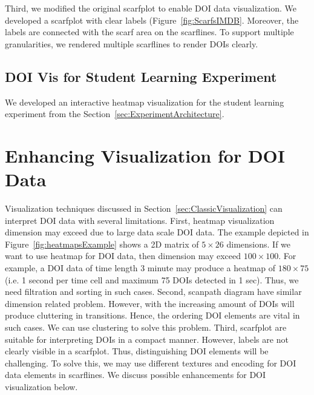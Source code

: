 Third, we modified the original scarfplot to enable DOI data visualization. We developed a scarfplot with clear labels (Figure~\ref{fig:ScarfsIMDB}. Moreover, the labels are connected with the scarf area on the scarflines. To support multiple granularities, we rendered multiple scarflines to render DOIs clearly. 

\subsection{DOI Vis for Student Learning Experiment}
We developed an interactive heatmap visualization for the student learning experiment from the Section~\ref{sec:ExperimentArchitecture}.  
\section{Enhancing Visualization for DOI Data}
Visualization techniques discussed in Section~\ref{sec:ClassicVisualization} can interpret DOI data with several limitations. First, heatmap visualization dimension may exceed due to large data scale DOI data. The example depicted in Figure~\ref{fig:heatmapsExample} shows a 2D matrix of $5 \times 26$ dimensions. If we want to use heatmap for DOI data, then dimension may exceed $100 \times 100$. For example, a DOI data of time length 3 minute may produce a heatmap of $180 \times 75$ (i.e. 1 second per time cell and maximum 75 DOIs detected in 1 sec). Thus, we need filtration and sorting in such cases. Second, scanpath diagram have similar dimension related problem. However, with the increasing amount of DOIs will produce cluttering in transitions. Hence, the ordering DOI elements are vital in such cases. We can use clustering to solve this problem. Third, scarfplot are suitable for interpreting DOIs in a compact manner. However, labels are not clearly visible in a scarfplot. Thus, distinguishing DOI elements will be challenging. To solve this, we may use different textures and encoding for DOI data elements in scarflines. We discuss possible enhancements for DOI visualization below. 

